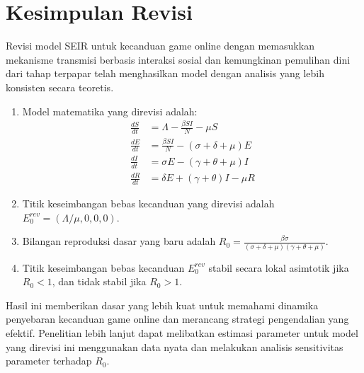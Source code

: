 \documentclass[12pt,a4paper]{article}
\begin{document}
\section{Kesimpulan Revisi}
Revisi model SEIR untuk kecanduan game online dengan memasukkan mekanisme transmisi berbasis interaksi sosial dan kemungkinan pemulihan dini dari tahap terpapar telah menghasilkan model dengan analisis yang lebih konsisten secara teoretis.
\begin{enumerate}
    \item Model matematika yang direvisi adalah:
        \begin{align*}
        \frac{dS}{dt} &= \Lambda - \frac{\beta S I}{N} - \mu S \\
        \frac{dE}{dt} &= \frac{\beta S I}{N} - (\sigma + \delta + \mu)E \\
        \frac{dI}{dt} &= \sigma E - (\gamma + \theta + \mu)I \\
        \frac{dR}{dt} &= \delta E + (\gamma + \theta)I - \mu R
        \end{align*}
    \item Titik keseimbangan bebas kecanduan yang direvisi adalah $E_0^{rev} = (\Lambda/\mu, 0, 0, 0)$.
    \item Bilangan reproduksi dasar yang baru adalah $R_0 = \frac{\beta \sigma}{(\sigma + \delta + \mu)(\gamma + \theta + \mu)}$.
    \item Titik keseimbangan bebas kecanduan $E_0^{rev}$ stabil secara lokal asimtotik jika $R_0 < 1$, dan tidak stabil jika $R_0 > 1$.
\end{enumerate}
Hasil ini memberikan dasar yang lebih kuat untuk memahami dinamika penyebaran kecanduan game online dan merancang strategi pengendalian yang efektif. Penelitian lebih lanjut dapat melibatkan estimasi parameter untuk model yang direvisi ini menggunakan data nyata dan melakukan analisis sensitivitas parameter terhadap $R_0$.

\end{document}
